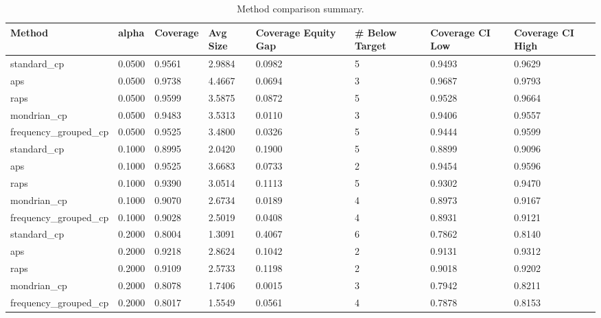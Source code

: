 \begin{table}[htbp]
\centering
\caption{Method comparison summary.}
\label{tab:method\_comparison}
\begin{tabular}{llllllll}
\hline
Method & alpha & Coverage & Avg Size & Coverage Equity Gap & \# Below Target & Coverage CI Low & Coverage CI High \\
\hline
standard\_cp & 0.0500 & 0.9561 & 2.9884 & 0.0982 & 5 & 0.9493 & 0.9629 \\
aps & 0.0500 & 0.9738 & 4.4667 & 0.0694 & 3 & 0.9687 & 0.9793 \\
raps & 0.0500 & 0.9599 & 3.5875 & 0.0872 & 5 & 0.9528 & 0.9664 \\
mondrian\_cp & 0.0500 & 0.9483 & 3.5313 & 0.0110 & 3 & 0.9406 & 0.9557 \\
frequency\_grouped\_cp & 0.0500 & 0.9525 & 3.4800 & 0.0326 & 5 & 0.9444 & 0.9599 \\
standard\_cp & 0.1000 & 0.8995 & 2.0420 & 0.1900 & 5 & 0.8899 & 0.9096 \\
aps & 0.1000 & 0.9525 & 3.6683 & 0.0733 & 2 & 0.9454 & 0.9596 \\
raps & 0.1000 & 0.9390 & 3.0514 & 0.1113 & 5 & 0.9302 & 0.9470 \\
mondrian\_cp & 0.1000 & 0.9070 & 2.6734 & 0.0189 & 4 & 0.8973 & 0.9167 \\
frequency\_grouped\_cp & 0.1000 & 0.9028 & 2.5019 & 0.0408 & 4 & 0.8931 & 0.9121 \\
standard\_cp & 0.2000 & 0.8004 & 1.3091 & 0.4067 & 6 & 0.7862 & 0.8140 \\
aps & 0.2000 & 0.9218 & 2.8624 & 0.1042 & 2 & 0.9131 & 0.9312 \\
raps & 0.2000 & 0.9109 & 2.5733 & 0.1198 & 2 & 0.9018 & 0.9202 \\
mondrian\_cp & 0.2000 & 0.8078 & 1.7406 & 0.0015 & 3 & 0.7942 & 0.8211 \\
frequency\_grouped\_cp & 0.2000 & 0.8017 & 1.5549 & 0.0561 & 4 & 0.7878 & 0.8153 \\
\hline
\end{tabular}
\end{table}
